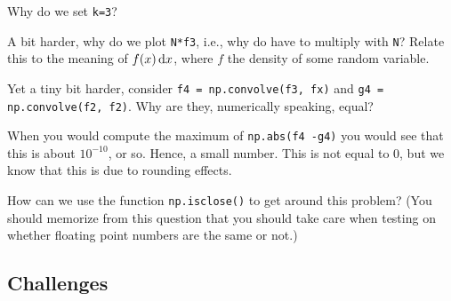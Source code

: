 \documentclass[assignments]{subfiles}
\begin{document}
\begin{exercise}
Why do we set \texttt{k=3}?
\begin{solution}
\end{solution}
\end{exercise}

\begin{exercise}
A bit harder, why do we plot \texttt{N*f3}, i.e., why do have to multiply with \texttt{N}? Relate this to the meaning of $f(x)\,\textrm{d}x$, where $f$ the density of some random variable.
\begin{solution}
\end{solution}
\end{exercise}

\begin{exercise}
Yet a tiny bit harder, consider \texttt{f4 = np.convolve(f3, fx)} and \texttt{g4 = np.convolve(f2, f2)}. Why are they, numerically speaking,  equal?
\begin{solution}
\end{solution}
\end{exercise}

\begin{exercise}
When you would compute the maximum of \texttt{np.abs(f4 -g4)} you would see that this is about $10^{-10}$, or so.
Hence, a small number.
This is not equal to 0, but we know that this is due to rounding effects.

How can we use the function \texttt{np.isclose()} to get around this problem?
(You should memorize from this question that you should take care when testing on whether floating point numbers are the same or not.)
\begin{solution}
\end{solution}
\end{exercise}



\subsection{Challenges}
\label{sec:challenges-1}
\end{document}
